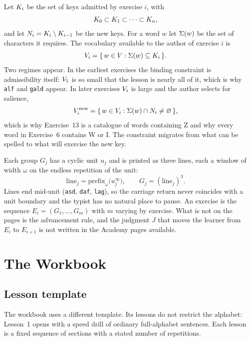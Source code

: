 Let $K_i$ be the set of keys admitted by exercise $i$, with
\[
K_0\subset K_1\subset\cdots\subset K_n,
\]
and let $N_i=K_i\setminus K_{i-1}$ be the new keys. For a word $w$ let $\Sigma(w)$ be the set of characters it requires. The vocabulary available to the author of exercise $i$ is
\[
V_i=\{\,w\in V:\Sigma(w)\subseteq K_i\,\}.
\]
Two regimes appear. In the earliest exercises the binding constraint is admissibility itself: $V_1$ is so small that the lesson is nearly all of it, which is why \texttt{alf} and \texttt{gald} appear. In later exercises $V_i$ is large and the author selects for salience,
\[
V_i^{\mathrm{new}}=\{\,w\in V_i:\Sigma(w)\cap N_i\neq\varnothing\,\},
\]
which is why Exercise~13 is a catalogue of words containing Z and why every word in Exercise~6 contains W or I. The constraint migrates from what can be spelled to what will exercise the new key.

Each group $G_j$ has a cyclic unit $u_j$ and is printed as three lines, each a window of width $\omega$ on the endless repetition of the unit:
\[
\mathrm{line}_j=\mathrm{prefix}_{\omega}\bigl(u_j^{\infty}\bigr),\qquad G_j=(\mathrm{line}_j)^{3}.
\]
Lines end mid-unit (\texttt{asd}, \texttt{daf}, \texttt{lag}), so the carriage return never coincides with a unit boundary and the typist has no natural place to pause. An exercise is the sequence $E_i=(G_1,\dots,G_m)$ with $m$ varying by exercise. What is not on the pages is the advancement rule, and the judgment $J$ that moves the learner from $E_i$ to $E_{i+1}$ is not written in the Academy pages available.

\section{The Workbook}

\subsection{Lesson template}

The workbook uses a different template. Its lessons do not restrict the alphabet: Lesson~1 opens with a speed drill of ordinary full-alphabet sentences. Each lesson is a fixed sequence of sections with a stated number of repetitions.

